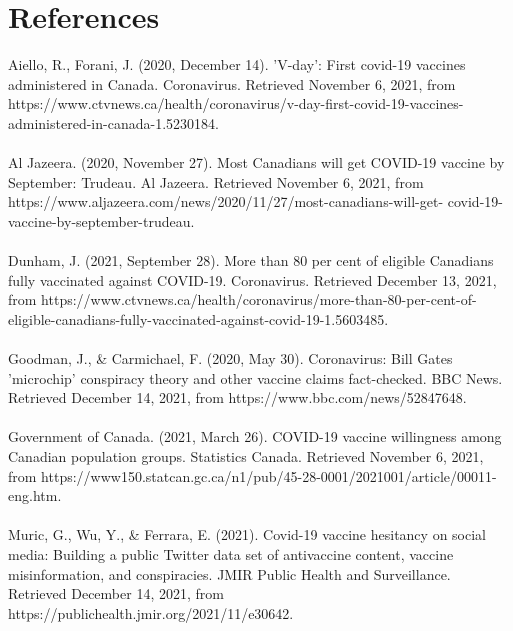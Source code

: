 \documentclass[fontsize=11pt]{article}
\begin{document}
\section*{References}

\begin{spverbatim}
Aiello, R.,   Forani, J. (2020, December 14).  ’V-day’:  First covid-19 vaccines administered in Canada.  Coronavirus. Retrieved November 6, 2021, from https://www.ctvnews.ca/health/coronavirus/v-day-first-covid-19-vaccines-administered-in-canada-1.5230184.\\\\

Al  Jazeera.   (2020,  November  27).   Most  Canadians  will  get  COVID-19  vaccine  by  September:  Trudeau.   Al Jazeera.  Retrieved November 6, 2021, from https://www.aljazeera.com/news/2020/11/27/most-canadians-will-get-
covid-19-vaccine-by-september-trudeau.\\\\

Dunham, J. (2021, September 28). More than 80 per cent of eligible Canadians fully vaccinated against COVID-19. Coronavirus. Retrieved December 13, 2021, from https://www.ctvnews.ca/health/coronavirus/more-than-80-per-cent-of-eligible-canadians-fully-vaccinated-against-covid-19-1.5603485.\\\\

Goodman, J., & Carmichael, F. (2020, May 30). Coronavirus: Bill Gates 'microchip' conspiracy theory and other vaccine claims fact-checked. BBC News. Retrieved December 14, 2021, from https://www.bbc.com/news/52847648. \\\\

Government of Canada.  (2021, March 26).  COVID-19 vaccine willingness among Canadian population groups. Statistics Canada. Retrieved November 6, 2021, from https://www150.statcan.gc.ca/n1/pub/45-28-0001/2021001/article/00011-eng.htm. \\\\

Muric, G., Wu, Y., & Ferrara, E. (2021). Covid-19 vaccine hesitancy on social media: Building a public Twitter data set of antivaccine content, vaccine misinformation, and conspiracies. JMIR Public Health and Surveillance. Retrieved December 14, 2021, from https://publichealth.jmir.org/2021/11/e30642. \\\\


\end{spverbatim}
\end{document}
